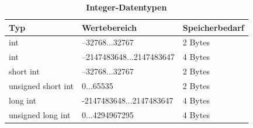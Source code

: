 \documentclass[a4paper,fontsize=14pt,DIV=calc,fleqn,parskip=half]{scrartcl}
\begin{document}
	\begin{table}[!h]%
		\centering
		\caption{\textbf{Integer-Datentypen}}
		\label{tab:Integer-Datentypen}
		\begin{tabular}{@{}lll@{}}
		\toprule
		\textbf{Typ}       & \textbf{Wertebereich}    & \textbf{Speicherbedarf} \\ \midrule
		int                & –32768...32767           & 2 Bytes                 \\
		int                & –2147483648...2147483647 & 4 Bytes                 \\
		short int          & –32768...32767           & 2 Bytes                 \\
		unsigned short int & 0...65535                & 2 Bytes                 \\
		long int           & -2147483648...2147483647 & 4 Bytes                 \\
		unsigned long int  & 0...4294967295           & 4 Bytes                 \\ \bottomrule
		\end{tabular}%
	\end{table}


    \printbibliography[category=cited]
\end{document}
